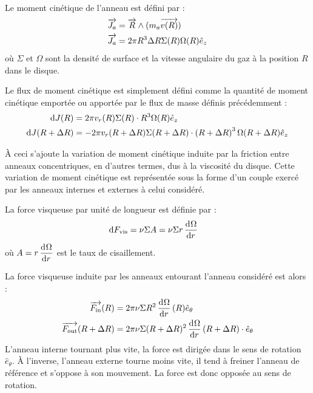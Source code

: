 Le moment cinétique de l'anneau est défini par :
\begin{align}
\vect{J_a} &= \vect{R} \wedge (m_a\vect{v(R)}) \nonumber\\
\vect{J_a} &= 2\pi R^3 \Delta R \Sigma(R)\Omega(R)\hat{e}_z\label{eq:J_a}
\end{align}
où $\Sigma$ et $\Omega$ sont la densité de surface et la vitesse angulaire du gaz à la position $R$ dans le disque.

Le flux de moment cinétique est simplement défini comme la quantité de moment cinétique emportée ou apportée par le flux de masse définis précédemment  :
\begin{subequations}
\begin{align}
\operatorname{d \!} J(R) &= 2\pi v_r(R) \Sigma(R)\cdot R^3\Omega(R)\hat{e}_z\label{eq:dJ_in}\\
\operatorname{d \!} J(R+\Delta R) &= -2\pi v_r(R+\Delta R) \Sigma(R+\Delta R)\cdot \left(R+\Delta R\right)^3\Omega(R+\Delta R)\hat{e}_z\label{eq:dJ_out}
\end{align}\label{eq:dJ}
\end{subequations}

\bigskip

À ceci s'ajoute la variation de moment cinétique induite par la friction entre anneaux concentriques, en d'autres termes, dus à la viscosité du disque. Cette variation de moment cinétique est représentée sous la forme d'un couple exercé par les anneaux internes et externes à celui considéré. 

La force visqueuse par unité de longueur est définie par :
\begin{align}
\operatorname{d \!} F_\text{vis} &= \nu \Sigma A = \nu \Sigma r \mathinner{ \dfrac{\operatorname{d \!}{^{}}\Omega}{\operatorname{d \!}{{r}^{}}} }
\end{align}
où $A=r \mathinner{ \dfrac{\operatorname{d \!}{^{}}\Omega}{\operatorname{d \!}{{r}^{}}} }$ est le taux de cisaillement.

La force visqueuse induite par les anneaux entourant l'anneau considéré est alors : 
\begin{subequations}
\begin{align}
{\overrightarrow{F_\text{in}}}(R)&= 2\pi\nu \Sigma R^2 \mathinner{ \dfrac{\operatorname{d \!}{^{}}\Omega}{\operatorname{d \!}{{r}^{}}} }(R) \hat{e}_\theta\\
{\overrightarrow{F_\text{out}}}(R+\Delta R)&= 2\pi\nu \Sigma (R+\Delta R)^2 \mathinner{ \dfrac{\operatorname{d \!}{^{}}\Omega}{\operatorname{d \!}{{r}^{}}} }(R+\Delta R) \cdot \hat{e}_\theta
\end{align}
\end{subequations}
L'anneau interne tournant plus vite, la force est dirigée dans le sens de rotation $\hat{e}_\theta$. À l'inverse, l'anneau externe tourne moins vite, il tend à freiner l'anneau de référence et s'oppose à son mouvement. La force est donc opposée au sens de rotation.

